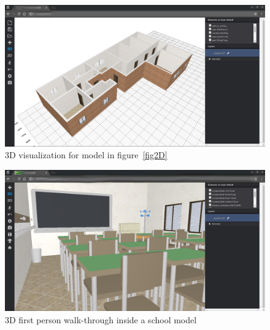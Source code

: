 \begin{figure}[htb]
\centering
\includegraphics[width=\linewidth]{contents/images/fig-pianta-3d}
\caption{3D visualization for model in figure~\ref{fig2D}}
\label{fig3D}
\end{figure}

\begin{figure}[htb]
\centering
\includegraphics[width=\linewidth]{contents/images/3d-school}
\caption{3D first person walk-through inside a school model}
\label{fig3D-school}
\end{figure}